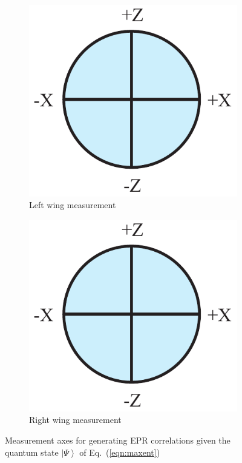 \documentclass[letterpaper,onecolumn,nofootinbib]{revtex4}
\begin{document}
\begin{figure}[h]
	        \begin{subfigure}[b]{0.18\textwidth}
                	\centering
                	\includegraphics[width=\textwidth]{alice}
		\caption{Left wing measurement}
		\label{fig:alice-epr}
	\end{subfigure}
	\hspace{8em}
        \begin{subfigure}[b]{0.18\textwidth}
                	\centering
                	\includegraphics[width=\textwidth]{bob-epr}
             	\caption{Right wing measurement}
                	\label{fig:bob-epr}
        \end{subfigure}
 \caption{Measurement axes for generating EPR correlations given the quantum state $\left\vert \Psi \right\rangle$ of Eq.~(\ref{eqn:maxent})}
\label{fig:epr-meas}
\end{figure}
\end{document}
